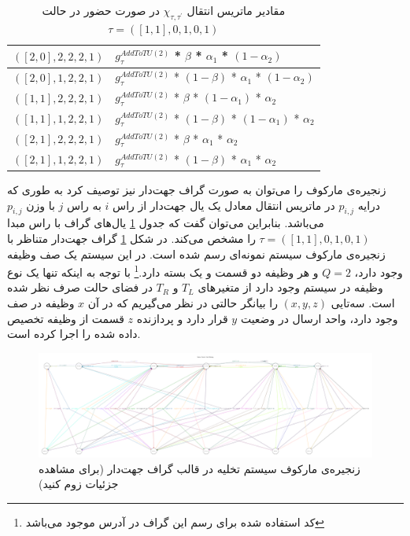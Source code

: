 \begin{table}[H]
\begin{latin}
\begin{tabular}{|l|l|}
$([2,0], 2, 2, 2, 1 )$ & $g_{\tau}^{A d d T o T U ( 2 )}$ * $\beta$ * $\alpha_1$ * $(1 - \alpha_2)$        \\ \hline
$([2,0], 1, 2, 2, 1 )$ & $g_{\tau}^{A d d T o T U ( 2 )}$ * $(1 - \beta)$ * $\alpha_1$ * $(1 - \alpha_2)$  \\ \hline
$([1,1], 2, 2, 2, 1 )$ & $g_{\tau}^{A d d T o T U ( 2 )}$ * $\beta$ * $(1 - \alpha_1)$ * $\alpha_2$        \\ \hline
$([1,1], 1, 2, 2, 1 )$ & $g_{\tau}^{A d d T o T U ( 2 )}$ * $(1 - \beta)$ * $(1 - \alpha_1)$ * $\alpha_2$  \\ \hline
$([2,1], 2, 2, 2, 1 )$ & $g_{\tau}^{A d d T o T U ( 2 )}$ * $\beta$ * $\alpha_1$ * $\alpha_2$              \\ \hline
$([2,1], 1, 2, 2, 1 )$ & $g_{\tau}^{A d d T o T U ( 2 )}$ * $(1 - \beta)$ * $\alpha_1$ * $\alpha_2$        \\ \hline



\end{tabular}
	\end{latin}
\caption[مقادیر ماتریس انتقال]{مقادیر ماتریس انتقال $\chi_{\tau, \tau^{\prime}}$ در صورت حضور در حالت $\tau = ( [1, 1], 0, 1, 0, 1 )$}
	\label{table:transitions}
\end{table}
زنجیره‌ی مارکوف را می‌توان به صورت گراف جهت‌دار نیز توصیف کرد به طوری که درایه $p_{i, j}$ در ماتریس انتقال معادل یک یال جهت‌دار از راس $i$ به راس $j$ با وزن $p_{i, j}$ می‌باشد. بنابراین می‌توان گفت که جدول \ref{table:transitions} یال‌های گراف با راس مبدا $\tau = ( [1, 1], 0, 1, 0, 1 )$ را مشخص می‌کند. در شکل \ref{fig:digraph} گراف جهت‌دار متناظر با زنجیره‌ی مارکوف سیستم نمونه‌ای رسم شده است. در این سیستم یک صف وظیفه وجود دارد، \(Q = 2\) و هر وظیفه دو قسمت و یک بسته دارد.\footnote{کد استفاده شده برای رسم این گراف در آدرس  موجود می‌باشد} با توجه به اینکه تنها یک نوع وظیفه در سیستم وجود دارد از متغیرهای $T_L$ و $T_R$ در فضای حالت صرف نظر شده است. سه‌تایی $(x, y, z)$ را بیانگر حالتی در نظر می‌گیریم که در آن $x$ وظیفه در صف وجود دارد، واحد ارسال در وضعیت $y$ قرار دارد و پردازنده $z$ قسمت از وظیفه تخصیص داده شده را اجرا کرده است.

\newpage
\begin{landscape}
	\begin{figure}
		\centering
		\includegraphics[width=1.5\textwidth]{figures/graph.pdf}
		\caption[زنجیره‌ی مارکوف سیستم تخلیه در قالب گراف جهت‌دار]{
			زنجیره‌ی مارکوف سیستم تخلیه در قالب گراف جهت‌دار (برای مشاهده جزئیات زوم کنید)
		}
		\label{fig:digraph}
	\end{figure}
\end{landscape}
\newpage
